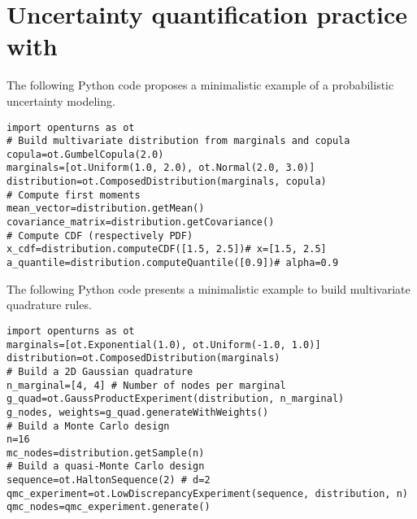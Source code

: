 \cleardoublepage
\chapter{Uncertainty quantification practice with \ot}
\label{apx:D}




\begin{otexample}
    The following Python code proposes a minimalistic \ot example of a probabilistic uncertainty modeling. 
    \lstset{style=mystyle, language=python}
%
\begin{lstlisting}
import openturns as ot
# Build multivariate distribution from marginals and copula
copula=ot.GumbelCopula(2.0)
marginals=[ot.Uniform(1.0, 2.0), ot.Normal(2.0, 3.0)]
distribution=ot.ComposedDistribution(marginals, copula)
# Compute first moments
mean_vector=distribution.getMean()
covariance_matrix=distribution.getCovariance()
# Compute CDF (respectively PDF)
x_cdf=distribution.computeCDF([1.5, 2.5])# x=[1.5, 2.5]
a_quantile=distribution.computeQuantile([0.9])# alpha=0.9
\end{lstlisting}
%
\end{otexample}

\begin{otexample}
    The following Python code presents a minimalistic \ot example to build multivariate quadrature rules.
%
\lstset{style=mystyle, language=python}
\begin{lstlisting}
import openturns as ot
marginals=[ot.Exponential(1.0), ot.Uniform(-1.0, 1.0)]
distribution=ot.ComposedDistribution(marginals)
# Build a 2D Gaussian quadrature
n_marginal=[4, 4] # Number of nodes per marginal
g_quad=ot.GaussProductExperiment(distribution, n_marginal)
g_nodes, weights=g_quad.generateWithWeights()
# Build a Monte Carlo design
n=16 
mc_nodes=distribution.getSample(n)
# Build a quasi-Monte Carlo design
sequence=ot.HaltonSequence(2) # d=2
qmc_experiment=ot.LowDiscrepancyExperiment(sequence, distribution, n)
qmc_nodes=qmc_experiment.generate()
\end{lstlisting}
%
\end{otexample}


